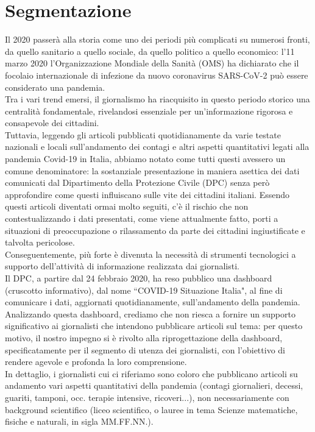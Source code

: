\section{Segmentazione}
Il 2020 passerà alla storia come uno dei periodi più complicati su numerosi fronti, da quello sanitario a quello sociale, 
da quello politico a quello economico: l'11 marzo 2020 l'Organizzazione Mondiale della Sanità (OMS) ha dichiarato che il 
focolaio internazionale di infezione da nuovo coronavirus SARS-CoV-2 può essere considerato una pandemia.\\
Tra i vari trend emersi, il giornalismo ha riacquisito in questo periodo storico una centralità fondamentale, rivelandosi 
essenziale per un'informazione rigorosa e consapevole dei cittadini.\\
Tuttavia, leggendo gli articoli pubblicati quotidianamente da varie testate nazionali e locali sull'andamento dei contagi 
e altri aspetti quantitativi legati alla pandemia Covid-19 in Italia, abbiamo notato come tutti questi avessero un comune 
denominatore: la sostanziale presentazione in maniera asettica dei dati comunicati dal Dipartimento della Protezione Civile 
(DPC) senza però approfondire come questi influiscano sulle vite dei cittadini italiani. Essendo questi articoli diventati 
ormai molto seguiti, c'è il rischio che non contestualizzando i dati presentati, come viene attualmente fatto, porti a 
situazioni di preoccupazione o rilassamento da parte dei cittadini ingiustificate e talvolta pericolose.\\
Conseguentemente, più forte è divenuta la necessità di strumenti tecnologici a supporto dell'attività di informazione 
realizzata dai giornalisti.\\
Il DPC, a partire dal 24 febbraio 2020, ha reso pubblico una dashboard (cruscotto informativo), dal nome ``COVID-19 Situazione Italia", 
al fine di comunicare i dati, aggiornati quotidianamente, sull'andamento della pandemia.\\
Analizzando questa dashboard, crediamo che non riesca a fornire un supporto significativo ai giornalisti che intendono pubblicare 
articoli sul tema: per questo motivo, il nostro impegno si è rivolto alla riprogettazione della dashboard, specificatamente per il 
segmento di utenza dei giornalisti, con l'obiettivo di rendere agevole e profonda la loro comprensione.\\
In dettaglio, i giornalisti cui ci riferiamo sono coloro che pubblicano articoli su andamento vari aspetti quantitativi della 
pandemia (contagi giornalieri, decessi, guariti, tamponi, occ. terapie intensive, ricoveri...), non necessariamente con 
background scientifico (liceo scientifico, o lauree in tema Scienze matematiche, fisiche e naturali, in sigla MM.FF.NN.).